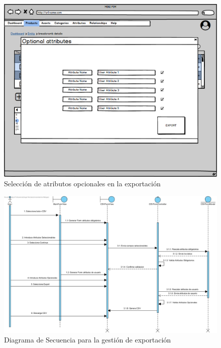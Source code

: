 \begin{figure}[H]
    \includegraphics[width=1\linewidth]{assets/mockups/RF8 Seleccion atributos opcionales.png}
    \caption{Selección de atributos opcionales en la exportación}
\end{figure}

\begin{figure}[H]
    \includegraphics[width=1\linewidth]{assets/sequence/RF8.jpg}
    \caption{Diagrama de Secuencia para la gestión de exportación}
\end{figure}